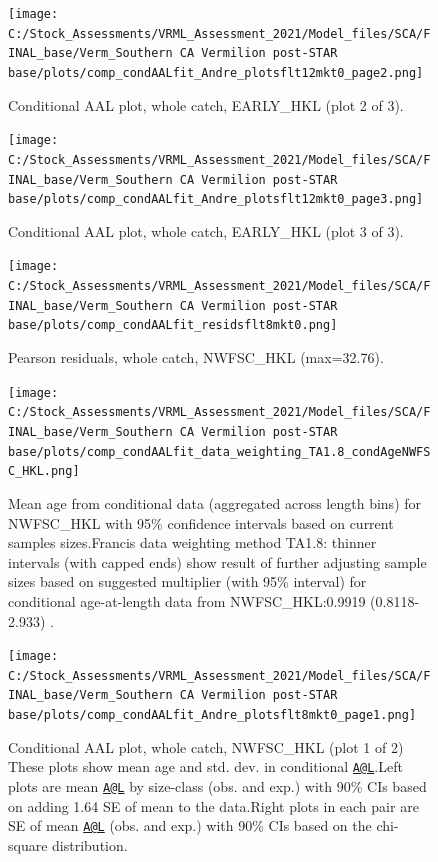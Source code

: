 \documentclass[
  english,
  a4paper,
]{article}
\begin{document}
\begin{figure}
\centering
\texttt{[image: C:/Stock\_Assessments/VRML\_Assessment\_2021/Model\_files/SCA/FINAL\_base/Verm\_Southern CA Vermilion post-STAR base/plots/comp\_condAALfit\_Andre\_plotsflt12mkt0\_page2.png]}
\caption{Conditional AAL plot, whole catch, EARLY\_HKL (plot 2 of 3).\label{fig:comp_condAALfit_Andre_plotsflt12mkt0_page2}}
\end{figure}

\begin{figure}
\centering
\texttt{[image: C:/Stock\_Assessments/VRML\_Assessment\_2021/Model\_files/SCA/FINAL\_base/Verm\_Southern CA Vermilion post-STAR base/plots/comp\_condAALfit\_Andre\_plotsflt12mkt0\_page3.png]}
\caption{Conditional AAL plot, whole catch, EARLY\_HKL (plot 3 of 3).\label{fig:comp_condAALfit_Andre_plotsflt12mkt0_page3}}
\end{figure}

\begin{figure}
\centering
\texttt{[image: C:/Stock\_Assessments/VRML\_Assessment\_2021/Model\_files/SCA/FINAL\_base/Verm\_Southern CA Vermilion post-STAR base/plots/comp\_condAALfit\_residsflt8mkt0.png]}
\caption{Pearson residuals, whole catch, NWFSC\_HKL (max=32.76).\label{fig:comp_condAALfit_residsflt8mkt0}}
\end{figure}

\begin{figure}
\centering
\texttt{[image: C:/Stock\_Assessments/VRML\_Assessment\_2021/Model\_files/SCA/FINAL\_base/Verm\_Southern CA Vermilion post-STAR base/plots/comp\_condAALfit\_data\_weighting\_TA1.8\_condAgeNWFSC\_HKL.png]}
\caption{Mean age from conditional data (aggregated across length bins) for NWFSC\_HKL with 95\% confidence intervals based on current samples sizes.Francis data weighting method TA1.8: thinner intervals (with capped ends) show result of further adjusting sample sizes based on suggested multiplier (with 95\% interval) for conditional age-at-length data from NWFSC\_HKL:0.9919 (0.8118-2.933) .\label{fig:comp_condAALfit_data_weighting_TA1.8_condAgeNWFSC_HKL}}
\end{figure}

\begin{figure}
\centering
\texttt{[image: C:/Stock\_Assessments/VRML\_Assessment\_2021/Model\_files/SCA/FINAL\_base/Verm\_Southern CA Vermilion post-STAR base/plots/comp\_condAALfit\_Andre\_plotsflt8mkt0\_page1.png]}
\caption{Conditional AAL plot, whole catch, NWFSC\_HKL (plot 1 of 2)
These plots show mean age and std. dev. in conditional \href{mailto:A@L}{\nolinkurl{A@L}}.Left plots are mean \href{mailto:A@L}{\nolinkurl{A@L}} by size-class (obs. and exp.) with 90\% CIs based on adding 1.64 SE of mean to the data.Right plots in each pair are SE of mean \href{mailto:A@L}{\nolinkurl{A@L}} (obs. and exp.) with 90\% CIs based on the chi-square distribution.\label{fig:comp_condAALfit_Andre_plotsflt8mkt0_page1}}
\end{figure}
\end{document}
